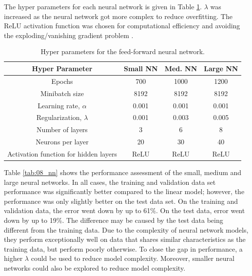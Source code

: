 The hyper parameters for each neural network is given in Table \ref{tab:08NN_hp}. $\lambda$ was increased as the neural network got more complex to reduce overfitting.  The ReLU activation function was chosen for computational efficiency and avoiding the exploding/vanishing gradient problem \cite{ReLU}.
\begin{table}[h]
    \centering
    {
    \begin{tabular}{ c | c | c | c}
        Hyper Parameter                            &  Small NN  &  Med. NN  & Large NN       \\
        \hline
        Epochs                                     &  700       & 1000      & 1200  \\
        Minibatch size                             &  8192      & 8192      & 8192  \\
        Learning rate, $\alpha$                    &  0.001     & 0.001     & 0.001 \\
        Regularization, $\lambda$                  &  0.001     & 0.003     & 0.005 \\
        Number of layers                           &  3         & 6         & 8     \\
        Neurons per layer                          &  20        & 30        & 40    \\
        Activation function for hidden layers      & ReLU       & ReLU      & ReLU  \\
    \end{tabular}}
    \caption{Hyper parameters for the feed-forward neural network.}
    \label{tab:08NN_hp}
\end{table}

Table \ref{tab:08_nn} shows the performance assessment of the small, medium and large neural networks.  In all cases, the training and validation data set performance was significantly better compared to the linear model; however, the performance was only slightly better on the test data set. On the training and validation data, the error went down by up to 61\%.  On the test data, error went down by up to 19\%. The difference may be caused by the test data being different from the training data.  Due to the complexity of neural network models, they perform exceptionally well on data that shares similar characteristics as the training data, but perform poorly otherwise. To close the gap in performance, a higher $\lambda$ could be used to reduce model complexity.  Moreover, smaller neural networks could also be explored to reduce model complexity.

